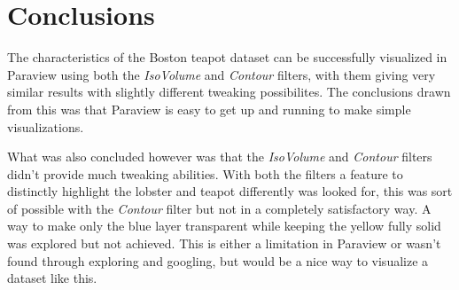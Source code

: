 \documentclass{article}
\begin{document}
    \section{Conclusions}
    The characteristics of the Boston teapot dataset can be successfully visualized in Paraview using both the \textit{IsoVolume} and \textit{Contour} filters, with them giving very similar results with slightly different tweaking possibilites. The conclusions drawn from this was that Paraview is easy to get up and running to make simple visualizations. 

    What was also concluded however was that the \textit{IsoVolume} and \textit{Contour} filters didn't provide much tweaking abilities. With both the filters a feature to distinctly highlight the lobster and teapot differently was looked for, this was sort of possible with the \textit{Contour} filter but not in a completely satisfactory way. A way to make only the blue layer transparent while keeping the yellow fully solid was explored but not achieved. This is either a limitation in Paraview or wasn't found through exploring and googling, but would be a nice way to visualize a dataset like this. 

    \newpage
\end{document}
